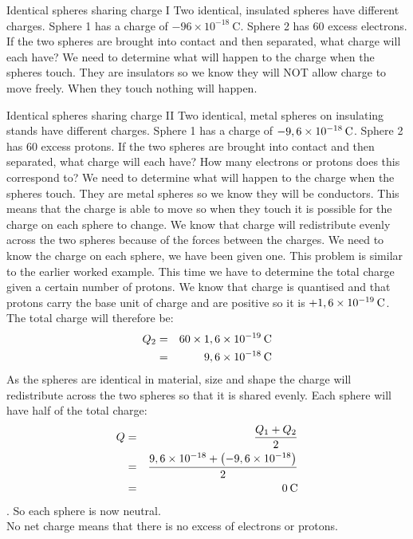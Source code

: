 \begin{wex}{Identical spheres sharing charge I}{
 Two identical, insulated spheres have different charges. Sphere 1 has a charge of $-96\ensuremath{\times}{10}^{-18}~\text{C}$. Sphere 2 has 60 excess electrons. If the two spheres are brought into contact and then separated, what charge will each have?}{
         We need to determine what will happen to the charge when the spheres touch. They are insulators so we know they will NOT allow charge to move freely. When they touch nothing will happen. }\end{wex}


    \begin{wex}{Identical spheres sharing charge II}{
 \label{m38781*id1166019825381}Two identical, metal spheres on insulating stands have different charges. Sphere 1 has a charge of $-9,6\ensuremath{\times}{10}^{-18}\phantom{\rule{2pt}{0ex}}\text{C}$. Sphere 2 has 60 excess protons. If the two spheres are brought into contact and then separated, what charge will each have? How many electrons or protons does this correspond to?}{ We need to determine what will happen to the charge when the spheres touch. They are metal spheres so we know they will be conductors. This means that the charge is able to move so when they touch it is possible for the charge on each sphere to change. We know that charge will redistribute evenly across the two spheres because of the forces between the charges. We need to know the charge on each sphere, we have been given one.
This problem is similar to the earlier worked example. This time we have to determine the total charge given a certain number of protons. We know that charge is quantised and that protons carry the base unit of charge and are positive so it is $+1,6\ensuremath{\times}{10}^{-19}\phantom{\rule{2pt}{0ex}}\text{C}$. 
The total charge will therefore be:\newline
\begin{eqnarray*}{Q}_{2}&=&60\ensuremath{\times}1,6\ensuremath{\times}{10}^{-19}\phantom{\rule{2pt}{0ex}}\text{C}\\ 
\phantom{x}&=&9,6\ensuremath{\times}{10}^{-18}\phantom{\rule{2pt}{0ex}}\text{C}\end{eqnarray*}
As the spheres are identical in material, size and shape the charge will redistribute across the two spheres so that it is shared evenly. Each sphere will have half of the total charge:
\begin{eqnarray*}
Q&=&\frac{{Q}_{1}+{Q}_{2}}{2}\\ 
\phantom{x}&=&\frac{9,6\ensuremath{\times}{10}^{-18}+\left(-9,6\ensuremath{\times}{10}^{-18}\right)}{2}\\ 
\phantom{x}&=&0\phantom{\rule{2pt}{0ex}}\text{C}\end{eqnarray*}.
     So each sphere is now neutral.\\
    No net charge means that there is no excess of electrons or protons.}\end{wex}
    \noindent


